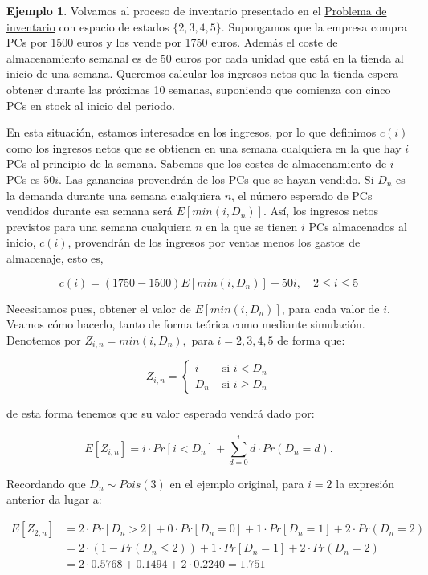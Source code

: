 \documentclass[
]{book}
\theoremstyle{definition}
\theoremstyle{definition}
\newtheorem{example}{Ejemplo}[chapter]
\theoremstyle{definition}
\theoremstyle{definition}
\theoremstyle{remark}
\begin{document}
\begin{example}
Volvamos al proceso de inventario presentado en el \protect\hyperlink{inventario}{Problema de inventario} con espacio de estados \(\{2,3,4,5\}\). Supongamos que la empresa compra PCs por 1500 euros y los vende por 1750 euros. Además el coste de almacenamiento semanal es de 50 euros por cada unidad que está en la tienda al inicio de una semana. Queremos calcular los ingresos netos que la tienda espera obtener durante las próximas 10 semanas, suponiendo que comienza con cinco PCs en stock al inicio del periodo.
\end{example}

En esta situación, estamos interesados en los ingresos, por lo que definimos \(c(i)\) como los ingresos netos que se obtienen en una semana cualquiera en la que hay \(i\) PCs al principio de la semana. Sabemos que los costes de almacenamiento de \(i\) PCs es \(50i\). Las ganancias provendrán de los PCs que se hayan vendido. Si \(D_n\) es la demanda durante una semana cualquiera \(n\), el número esperado de PCs vendidos durante esa semana será \(E[min(i, D_n)]\). Así, los ingresos netos previstos para una semana cualquiera \(n\) en la que se tienen \(i\) PCs almacenados al inicio, \(c(i)\), provendrán de los ingresos por ventas menos los gastos de almacenaje, esto es,

\[c(i) = (1750-1500)E[min(i, D_n)] -50i, \quad 2 \leq i \leq 5\]

Necesitamos pues, obtener el valor de \(E[min(i, D_n)]\), para cada valor de \(i\). Veamos cómo hacerlo, tanto de forma teórica como mediante simulación. Denotemos por \(Z_{i,n} = min(i, D_n),\) para \(i=2, 3, 4, 5\) de forma que:

\begin{equation*}
Z_{i,n} =  
\begin{cases}
i & \text{ si } i <D_n \\
D_n & \text{ si } i \geq  D_n 
\end{cases}
\end{equation*}

de esta forma tenemos que su valor esperado vendrá dado por:

\[E[Z_{i,n}] = i \cdot Pr[i < D_n] + \sum_{d=0}^{i} d \cdot Pr(D_n=d).\]

Recordando que \(D_n\sim Pois(3)\) en el ejemplo original, para \(i=2\) la expresión anterior da lugar a:

\begin{eqnarray*}
E[Z_{2,n}] &= 2 \cdot Pr[D_n > 2] + 0 \cdot Pr[D_n = 0] + 1 \cdot Pr[D_n =1] +2 \cdot Pr(D_n=2) \\
&= 2 \cdot (1-Pr(D_n \leq 2)) + 1 \cdot Pr[D_n =1] + 2 \cdot Pr(D_n=2) \\
&= 2 \cdot 0.5768 +0.1494 +2 \cdot 0.2240 = 1.751
\end{eqnarray*}
\end{document}
